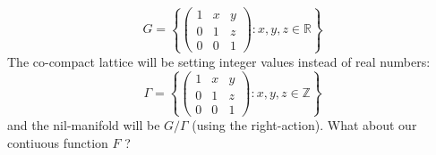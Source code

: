 \documentclass[12pt]{article}
\begin{document}
$$ G = \left\{ \left( \begin{array}{ccc} 1 & x & y \\ 0 & 1 & z \\ 0 & 0 & 1 \end{array} \right) : x, y , z \in \mathbb{R} \right\}$$
The co-compact lattice will be setting integer values instead of real numbers:
$$ \Gamma = \left\{ \left( \begin{array}{ccc} 1 & x & y \\ 0 & 1 & z \\ 0 & 0 & 1 \end{array} \right) : x, y , z \in \mathbb{Z} \right\} $$
and the nil-manifold will be $G/\Gamma$ (using the right-action).  What about our contiuous function $F$ ? 

\newpage
\end{document}
